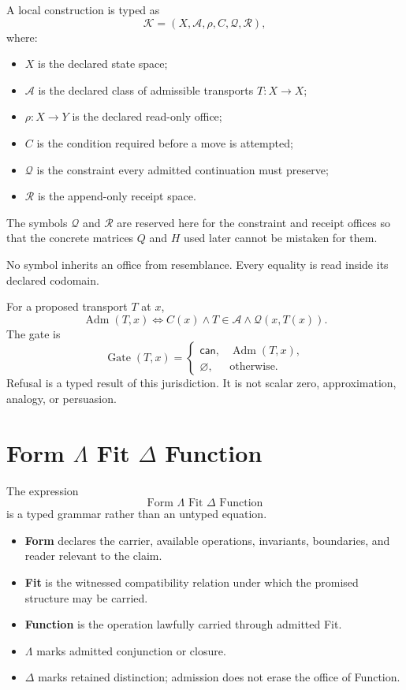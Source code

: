 \documentclass[11pt]{article}
\newcommand{\Adm}{\operatorname{Adm}}
\newcommand{\Gate}{\operatorname{Gate}}
\begin{document}
A local construction is typed as
\[
\mathcal K=(X,\mathcal A,\rho,C,\mathcal Q,\mathcal R),
\]
where:
\begin{itemize}
\item $X$ is the declared state space;
\item $\mathcal A$ is the declared class of admissible transports $T:X\to X$;
\item $\rho:X\to Y$ is the declared read-only office;
\item $C$ is the condition required before a move is attempted;
\item $\mathcal Q$ is the constraint every admitted continuation must preserve;
\item $\mathcal R$ is the append-only receipt space.
\end{itemize}

The symbols $\mathcal Q$ and $\mathcal R$ are reserved here for the constraint and receipt offices so that the concrete matrices $Q$ and $H$ used later cannot be mistaken for them.

No symbol inherits an office from resemblance. Every equality is read inside its declared codomain.

For a proposed transport $T$ at $x$,
\[
\Adm(T,x)
\Longleftrightarrow
C(x)\wedge T\in\mathcal A\wedge \mathcal Q(x,T(x)).
\]
The gate is
\[
\Gate(T,x)=
\begin{cases}
\mathsf{can}, & \Adm(T,x),\\
\varnothing, & \text{otherwise}.
\end{cases}
\]
Refusal is a typed result of this jurisdiction. It is not scalar zero, approximation, analogy, or persuasion.

\section{Form $\Lambda$ Fit $\Delta$ Function}

The expression
\[
\boxed{\text{Form }\Lambda\text{ Fit }\Delta\text{ Function}}
\]
is a typed grammar rather than an untyped equation.

\begin{itemize}
\item \textbf{Form} declares the carrier, available operations, invariants, boundaries, and reader relevant to the claim.
\item \textbf{Fit} is the witnessed compatibility relation under which the promised structure may be carried.
\item \textbf{Function} is the operation lawfully carried through admitted Fit.
\item $\Lambda$ marks admitted conjunction or closure.
\item $\Delta$ marks retained distinction; admission does not erase the office of Function.
\end{itemize}
\end{document}
